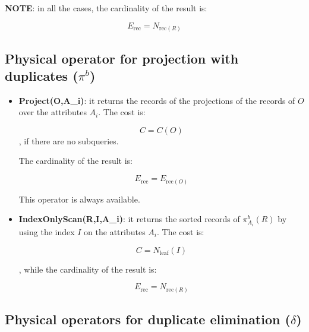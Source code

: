 \textbf{NOTE}: in all the cases, the cardinality of the result is:

$$
E_{\text{rec}} = N_{\text{rec}(R)}
$$

\subsection{Physical operator for projection with duplicates ($\pi^b$)}

\begin{itemize}
    \item \textbf{Project(O,A\_i)}: it returns the records of the projections of the records of $O$ over the attributes ${A_i}$. The cost is:

    $$
    C = C(O)
    $$
    , if there are no subqueries.

    The cardinality of the result is:

    $$
    E_{\text{rec}} = E_{\text{rec}(O)}
    $$

    This operator is always available.

    \item \textbf{IndexOnlyScan(R,I,A\_i)}: it returns the sorted records of $\pi_{A_i}^b(R)$ by using the index $I$ on the attributes $A_i$. The cost is:

    $$
    C = N_{\text{leaf}}(I)
    $$

    , while the cardinality of the result is:

    $$
    E_{\text{rec}} = N_{\text{rec}(R)}
    $$
    
\end{itemize}

\subsection{Physical operators for duplicate elimination ($\delta$)}

